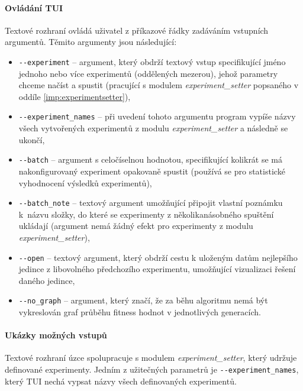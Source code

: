 \paragraph{Ovládání TUI} \label{doc_13_TUI_ovladani}
Textové rozhraní ovládá uživatel z příkazové řádky zadáváním vstupních
argumentů. Těmito argumenty jsou následující:

\begin{itemize}
    \item \texttt{-{}-experiment} -- argument, který obdrží textový vstup
        specifikující jméno jednoho nebo více experimentů (oddělených mezerou),
        jehož parametry chceme načíst a spustit (pracující s modulem
        \emph{experiment\_setter} popsaného v oddíle
        \ref{imp:experimentsetter}),
    \item \texttt{-{}-experiment\_names} -- při uvedení tohoto argumentu
        program vypíše názvy všech vytvořených experimentů z modulu
        \emph{experiment\_setter} a následně se ukončí,
    \item \texttt{-{}-batch} -- argument s celočíselnou hodnotou, specifikující
        kolikrát se má nakonfigurovaný experiment opakovaně spustit (používá
        se pro statistické vyhodnocení výsledků experimentů),
    \item \texttt{-{}-batch\_note} -- textový argument umožňující připojit
        vlastní poznámku k~názvu složky, do které se experimenty z
        několikanásobného spuštění ukládají (argument nemá žádný efekt pro
        experimenty z modulu \\\emph{experiment\_setter}),
    \item \texttt{-{}-open} -- textový argument, který obdrží cestu k uloženým
        datům nejlepšího jedince z libovolného předchozího experimentu,
        umožňující vizualizaci řešení daného jedince,
    \item \texttt{-{}-no\_graph} -- argument, který značí, že za běhu algoritmu
        nemá být vykreslován graf průběhu fitness hodnot v jednotlivých
        generacích.
\end{itemize}

\paragraph{Ukázky možných vstupů}
Textové rozhraní úzce spolupracuje s modulem \emph{experiment\_setter}, který
udržuje definované experimenty. Jedním z užitečných parametrů je
\texttt{-{}-experiment\_names}, který TUI nechá vypsat názvy všech definovaných
experimentů.

